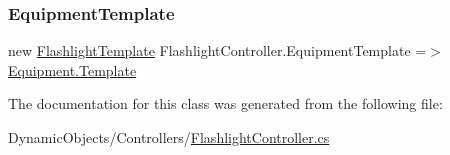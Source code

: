 \mbox{\label{class_flashlight_controller_a1a431b24c71437bfab2fe659b9b4db2d}} 
\subsubsection{\texorpdfstring{Equipment\+Template}{EquipmentTemplate}}
{\footnotesize\ttfamily new \mbox{\hyperlink{class_flashlight_template}{Flashlight\+Template}} Flashlight\+Controller.\+Equipment\+Template =$>$ \mbox{\hyperlink{class_equipment_a691c8de53afa564d0b1a0f1adb0978b7}{Equipment.\+Template}}}



The documentation for this class was generated from the following file\+:\begin{DoxyCompactItemize}
\item 
Dynamic\+Objects/\+Controllers/\mbox{\hyperlink{_flashlight_controller_8cs}{Flashlight\+Controller.\+cs}}\end{DoxyCompactItemize}
